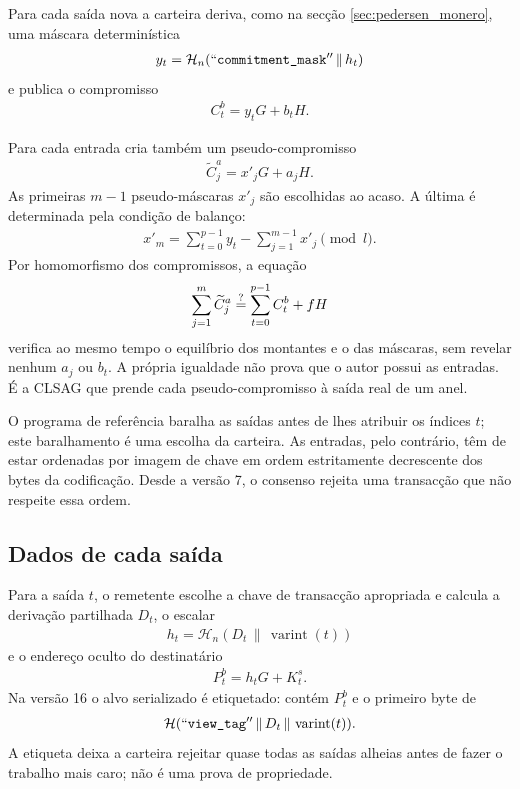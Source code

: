 Para cada saída nova a carteira deriva, como na secção
\ref{sec:pedersen_monero}, uma máscara determinística
\begin{align*}
 y_t=\mathcal H_n(``\texttt{commitment\_mask}''\,\|\,h_t)
\end{align*}
e publica o compromisso
\begin{align*}
 C^b_t=y_tG+b_tH.
\end{align*}

Para cada entrada cria também um pseudo-compromisso
\begin{align*}
 \widetilde C^a_j=x'_jG+a_jH.
\end{align*}
As primeiras \(m-1\) pseudo-máscaras \(x'_j\) são escolhidas ao acaso. A
última é determinada pela condição de balanço:
\begin{align*}
 x'_m=\sum_{t=0}^{p-1}y_t-\sum_{j=1}^{m-1}x'_j\pmod l.
\end{align*}
Por homomorfismo dos compromissos, a equação
\begin{align}
 \sum_{j=1}^{m}\widetilde C^a_j
 \stackrel{?}{=}
 \sum_{t=0}^{p-1}C^b_t+fH
 \label{eq:transaction-commitment-balance}
\index{c tilde@\(\protect\widetilde C\), pseudo-compromisso}
\end{align}
verifica ao mesmo tempo o equilíbrio dos montantes e o das máscaras, sem
revelar nenhum \(a_j\) ou \(b_t\). A própria igualdade não prova que o autor
possui as entradas. É a CLSAG que prende cada pseudo-compromisso à saída
real de um anel.

O programa de referência baralha as saídas antes de lhes atribuir os índices
\(t\); este baralhamento é uma escolha da carteira. As entradas, pelo contrário,
têm de estar ordenadas por imagem de chave em ordem estritamente decrescente
dos bytes da codificação. Desde a versão 7, o consenso rejeita uma transacção
que não respeite essa ordem.


\subsection{Dados de cada saída}

Para a saída \(t\), o remetente escolhe a chave de transacção apropriada e
calcula a derivação partilhada \(D_t\), o escalar
\begin{align*}
 h_t=\mathcal H_n(D_t\,\|\,\operatorname{varint}(t))
\end{align*}
e o endereço oculto do destinatário
\begin{align*}
 P^b_t=h_tG+K^s_t.
\end{align*}
Na versão 16 o alvo serializado é etiquetado: contém \(P^b_t\) e o primeiro
byte de
\begin{align*}
 \mathcal H(``\texttt{view\_tag}''\,\|\,D_t\,\|\,
                    \operatorname{varint}(t)).
\end{align*}
A etiqueta deixa a carteira rejeitar quase todas as saídas alheias antes de
fazer o trabalho mais caro; não é uma prova de propriedade.

